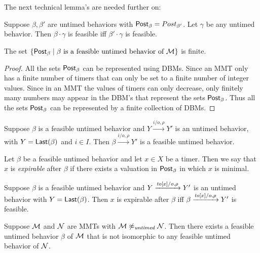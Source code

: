 The next technical lemma's are needed further on:

\begin{lemma}
\label{lemma: feasibility concatenation}
Suppose $\beta, \beta'$ are untimed behaviors with
$\mathsf{Post}_{\beta} = Post_{\beta'}$. Let $\gamma$ be any untimed behavior.
Then $\beta \cdot \gamma$ is feasible iff $\beta' \cdot \gamma$ is feasible.
\end{lemma}

\begin{lemma}
\label{lemma finitely many zones}
The set
$\{ \mathsf{Post}_{\beta} \mid \beta \mbox{ is a feasible untimed behavior of } {\cal M} \}$ is finite.
\end{lemma}

\begin{proof}
All the sets $\mathsf{Post}_{\beta}$ can be represented using DBMs. Since an MMT only has a finite number of timers that can only be set to a finite number of integer values. Since in an MMT the values of timers can only decrease, only finitely many numbers may
appear in the DBM's that represent the sets $\mathsf{Post}_{\beta}$. Thus all the sets $\mathsf{Post}_{\beta}$ can be represented by a finite
collection of DBMs.
\end{proof}

\begin{lemma}
Suppose $\beta$ is a feasible untimed behavior and $Y \xrightarrow{i/o, \rho} Y'$ is an untimed behavior,
with $Y = \mathsf{Last}({\beta})$ and $i \in I$.
Then $\beta \xrightarrow{i/o, \rho} Y'$ is a feasible untimed behavior.
\end{lemma}

Let $\beta$ be a feasible untimed behavior and let $x \in X$ be a timer. Then we say that $x$ is \emph{expirable} after $\beta$
if there exists a valuation in $\mathsf{Post}_{\beta}$ in which $x$ is minimal.

\begin{lemma}
Suppose $\beta$ is a feasible untimed behavior and $Y \xrightarrow{\mathit{to}[x]/o, \rho} Y'$ is an untimed behavior 
with $Y = \mathsf{Last}({\beta})$.
Then $x$ is expirable after $\beta$ iff $\beta \xrightarrow{\mathit{to}[x]/o, \rho} Y'$ is feasible.
\end{lemma}

\begin{lemma}
\label{not untimed}
Suppose ${\cal M}$ and ${\cal N}$ are MMTs with ${\cal M} \not\approx_{\mathit{untimed}} {\cal N}$.
Then there exists a feasible untimed behavior $\beta$ of ${\cal M}$ that is not isomorphic to any feasible untimed
behavior of ${\cal N}$.
\end{lemma}

